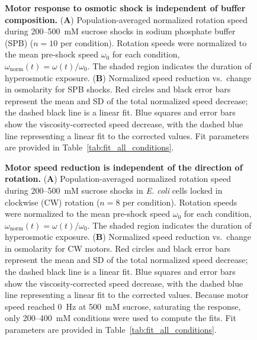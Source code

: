\documentclass[twocolumn]{biophys-new}%
\begin{document}
\begin{figure}
    \centering
    \caption{\textbf{Motor response to osmotic shock is independent of buffer composition.} (\textbf{A}) Population-averaged normalized rotation speed during 200--500~mM sucrose shocks in sodium phosphate buffer (SPB) ($n = 10$ per condition). Rotation speeds were normalized to the mean pre-shock speed $\omega_{\mathrm{0}}$ for each condition, $\omega_{\mathrm{norm}}(t) = \omega(t)/\omega_{\mathrm{0}}$. The shaded region indicates the duration of hyperosmotic exposure. (\textbf{B}) Normalized speed reduction vs.\ change in osmolarity for SPB shocks. Red circles and black error bars represent the mean and SD of the total normalized speed decrease; the dashed black line is a linear fit. Blue squares and error bars show the viscosity-corrected speed decrease, with the dashed blue line representing a linear fit to the corrected values. Fit parameters are provided in Table~\ref{tab:fit_all_conditions}.}
    \label{fig:sodium}
\end{figure}

 \begin{figure}
    \centering
    \caption{\textbf{Motor speed reduction is independent of the direction of rotation.}
    (\textbf{A}) Population-averaged normalized rotation speed during 200--500~mM sucrose shocks in \textit{E. coli} cells locked in clockwise (CW) rotation ($n = 8$ per condition). Rotation speeds were normalized to the mean pre-shock speed $\omega_{\mathrm{0}}$ for each condition, $\omega_{\mathrm{norm}}(t) = \omega(t)/\omega_{\mathrm{0}}$. The shaded region indicates the duration of hyperosmotic exposure.
    (\textbf{B}) Normalized speed reduction vs.\ change in osmolarity for CW motors. Red circles and black error bars represent the mean and SD of the total normalized speed decrease; the dashed black line is a linear fit. Blue squares and error bars show the viscosity-corrected speed decrease, with the dashed blue line representing a linear fit to the corrected values. Because motor speed reached 0~Hz at 500~mM sucrose, saturating the response, only 200--400~mM conditions were used to compute the fits. Fit parameters are provided in Table~\ref{tab:fit_all_conditions}.}
    \label{fig:clockwise}
\end{figure}
\end{document}
